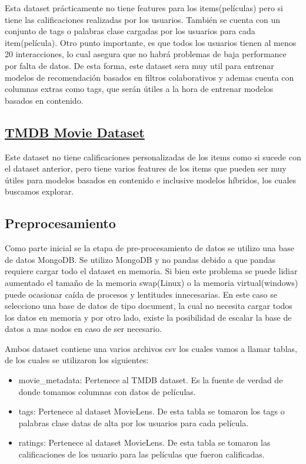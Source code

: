 \documentclass[11pt,a4paper,twoside]{thesis}
\begin{document}
Esta dataset prácticamente no tiene features para los items(películas) pero si tiene las calificaciones realizadas 
por los usuarios. También se cuenta con un conjunto de tags o palabras clase cargadas por los usuarios para cada 
item(película). Otro punto importante, es que todos los usuarios tienen al menos 20 interacciones, lo cual asegura
que no habrá problemas de baja performance por falta de datos. 
De esta forma, este dataset sera muy util para entrenar modelos de recomendación basados en filtros colaborativos
y ademas cuenta con columnas extras como tags, que serán útiles a la hora de entrenar modelos basados en contenido.


\subsection{\href{https://www.kaggle.com/datasets/rounakbanik/the-movies-dataset?select=movies_metadata.csv}{TMDB Movie Dataset}}


Este dataset no tiene calificaciones personalizadas de los items como si sucede con el dataset anterior, 
pero tiene varios features de los items que pueden ser muy útiles para modelos basados en contenido e inclusive
modelos híbridos, los cuales buscamos explorar.


\subsection{Preprocesamiento}

Como parte inicial se la etapa de pre-procesamiento de datos se utilizo una base de datos MongoDB. Se utilizo MongoDB 
y no pandas debido a que pandas requiere cargar todo el dataset en memoria. Si bien este problema se puede lidiar 
aumentado el tamaño de la memoria swap(Linux) o la memoria virtual(windows) puede ocasionar caída de procesos y lentitudes 
innecesarias. En este caso se selecciono una base de datos de tipo document, la cual no necesita cargar todos los datos 
en memoria y por otro lado, existe la posibilidad de escalar la base de datos a mas nodos en caso de ser necesario.


Ambos dataset contiene una varios archivos csv los cuales vamos a llamar tablas, de los cuales se utilizaron los siguientes:

\begin{itemize}
	\item movie\_metadata: Pertenece al TMDB dataset. Es la fuente de verdad de donde tomamos columnas con datos de películas.
	\item tags: Pertenece al dataset MovieLens. De esta tabla se tomaron los tags o palabras clase datas de alta por los usuarios para cada película.
	\item ratings: Pertenece al dataset MovieLens. De esta tabla se tomaron las calificaciones de los usuario para las películas que fueron calificadas.
\end{itemize}
\end{document}
